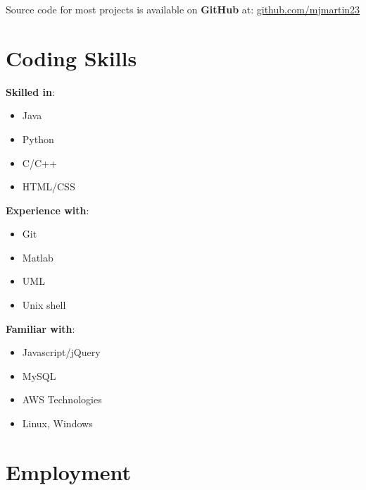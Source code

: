 \documentclass{myresume}
\begin{document}
Source code for most projects is available on \textbf{GitHub} at: \href{https://github.com/mjmartin23}{github.com/mjmartin23}

\section{Coding Skills}

\begin{minipage}[t]{0.33\textwidth}
	\textbf{Skilled in}:
	\begin{itemize}
		\vspace{-.5em}\item Java
		\vspace{-.75em}\item Python
		\vspace{-.75em}\item C/C++
		\vspace{-.75em}\item HTML/CSS
	\end{itemize}
\end{minipage}
\begin{minipage}[t]{0.33\textwidth}
	\textbf{Experience with}:
	\begin{itemize}
		\vspace{-.5em}\item Git
		\vspace{-.75em}\item Matlab
		\vspace{-.75em}\item UML
		\vspace{-.75em}\item Unix shell
	\end{itemize}
\end{minipage}
\begin{minipage}[t]{0.33\textwidth}
	\textbf{Familiar with}:
	\begin{itemize}
		\vspace{-.5em}\item Javascript/jQuery
		\vspace{-.75em}\item MySQL
		\vspace{-.75em}\item AWS Technologies
		\vspace{-.75em}\item Linux, Windows
	\end{itemize}
\end{minipage}

\section{Employment}
\end{document}
